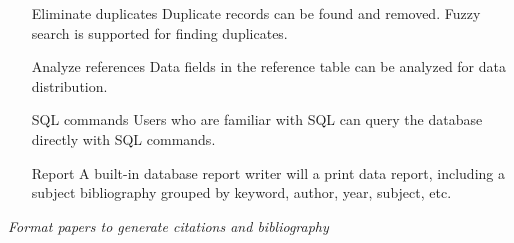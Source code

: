 \begin{itemize}
 \item[Eliminate duplicates] Duplicate records can be found and
 removed. Fuzzy search is supported for finding duplicates.

 \item[Analyze references] Data fields in the reference table can be
 analyzed for data distribution.

 \item[SQL commands] Users who are familiar with SQL can query the
 database directly with SQL commands.

 \item[Report] A built-in database report writer will a print data report,
 including a subject bibliography grouped by keyword, author, year,
 subject, etc.

\end{itemize}
\textit{Format papers to generate citations and bibliography}

